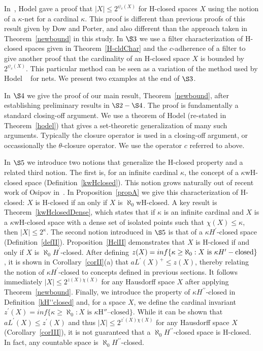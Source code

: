 \documentclass[11pt]{amsart}
\theoremstyle{definition}
\theoremstyle{remark}
\numberwithin{equation}{section}
\begin{document}
In~\cite{Hodel2006}, Hodel gave a proof that $|X|\leq 2^{\psi_c(X)}$ for H-closed spaces $X$ using the notion of a $\kappa$-net for a cardinal $\kappa$. This proof is different than previous proofs of this result given by Dow and Porter, and also different than the approach taken in Theorem~\ref{newbound} in this study. In $\S3$ we use a filter characterization of H-closed spaces given in Theorem~\ref{H-cldChar} and the $c$-adherence of a filter to give another proof that the cardinality of an H-closed space $X$ is bounded by $2^{\psi_c(X)}$. This particular method can be seen as a variation of the method used by Hodel ~\cite{Hodel2006} for nets. We present two examples at the end of $\S3$.

In $\S 4$ we give the proof of our main result, Theorem~\ref{newbound}, after establishing preliminary results in $\S2-\S4$. The proof is fundamentally a standard closing-off argument. We use a theorem of Hodel (re-stated in Theorem~\ref{hodel}) that gives a set-theoretic generalization of many such arguments. Typically the closure operator is used in a closing-off argument, or occassionally the $\theta$-closure operator. We use the operator $c$ referred to above.

In $\S5$ we introduce two notions that generalize the H-closed property and a related third notion. The first is, for an infinite cardinal $\kappa$, the concept of a $\kappa$wH-closed space (Definition~\ref{kwHclosed}). This notion grows naturally out of recent work of Osipov in~\cite{O}. In Proposition~\ref{propA} we give this characterization of H-closed: $X$ is H-closed  if an only if $X$ is $\aleph_0$wH-closed. A key result is Theorem~\ref{kwHclosedDense}, which states that if $\kappa$ is an infinite cardinal and $X$ is a $\kappa$wH-closed space with a dense set of isolated points such that $\chi(X)\leq\kappa$, then $|X|\leq 2^{\kappa}$. The second notion introduced in $\S5$ is that of a $\kappa H^\prime$-closed space (Definition~\ref{defII}). Proposition~\ref{HclII} demonstrates that $X$ is H-closed if and only if $X$ is $\aleph_0H^\prime$-closed. After defining $z(X)=inf\{\kappa\geq\aleph_0:X\textup{ is }\kappa H^\prime-\textup{closed}\}$, it is shown in Corollary~\ref{corII}(a) that $aL^\prime(X)^+\leq z(X)$, thereby relating the notion of $\kappa H^\prime$-closed to concepts defined in previous sections. It follows immediately $|X|\leq 2^{z(X)\chi(X)}$ for any Hausdorff space $X$ after applying Theorem~\ref{newbound}. Finally, we introduce the property of $\kappa H^{\prime\prime}$-closed in Definition~\ref{kH''closed} and, for a space $X$, we define the cardinal invariant $z^\prime(X) = inf\{\kappa \geq \aleph_0: X \text{ is } \kappa\text{H}''\text{--closed}\}$. While it can be shown that $aL^\prime(X)\leq z^\prime(X)$ and thus $|X|\leq 2^{z^\prime(X)\chi(X)}$ for any Hausdorff space $X$ (Corollary~\ref{corIII}), it is not guaranteed that a $\aleph_0H^{\prime\prime}$-closed space is H-closed. In fact, any countable space is $\aleph_0H^{\prime\prime}$-closed.
\end{document}
